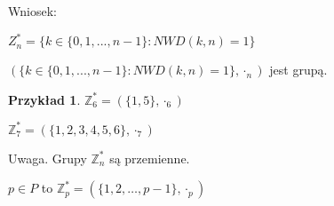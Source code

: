 \documentclass{article}
\theoremstyle{definition}
\theoremstyle{definition}
\theoremstyle{definition}
\newtheorem{pk}{Przykład}[subsection]
\theoremstyle{definition}
\begin{document}
Wniosek:
\begin{center}
$Z_n^* = \{k\in \{0,1,...,n-1\}: NWD(k,n)=1\}$
\end{center}

$(\{k\in \{0,1,...,n-1\}: NWD(k,n)=1\},\cdot_n)$ jest grupą.

\begin{pk}
    \item $\mathbb{Z}_6^*=(\{1,5\}, \cdot_6)$
    \item $\mathbb{Z}_7^*=(\{1,2,3,4,5,6\}, \cdot_7)$ 
\end{pk}

Uwaga. Grupy $\mathbb{Z}_n^*$ są przemienne.
 
$p\in P$ to $\mathbb{Z}_p^* = (\{1,2,\dots,p-1\}, \cdot_p)$
\end{document}
